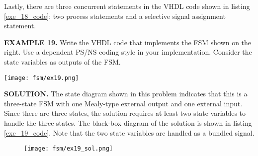 Lastly, there are three concurrent statements in the VHDL code shown in listing \ref{exe_18_code}: two process statements and a selective signal assignment statement. 

\begin{leftbar}
\begin{minipage}[t]{0.5\textwidth}
\vspace{10pt}
\noindent
\textbf{EXAMPLE 19.}
Write the VHDL code that implements the FSM shown on the right. Use a dependent PS/NS coding style in your implementation. Consider the state variables as outputs of the FSM.
\end{minipage}
\begin{minipage}[t]{0.47\textwidth}
\vspace{0pt}\raggedright
\centering
\texttt{[image: fsm/ex19.png]}
\end{minipage}
\end{leftbar}
\noindent
\textbf{SOLUTION.} The state diagram shown in this problem indicates that this is a three-state FSM with one Mealy-type external output and one external input. Since there are three states, the solution requires at least two state variables to handle the three states. The black-box diagram of the solution is shown in listing \ref{exe_19_code}. Note that the two state variables are handled as a bundled signal.

\newpage\clearpage
\begin{figure}[!h]
    \centering
	\texttt{[image: fsm/ex19\_sol.png]}
\end{figure}

